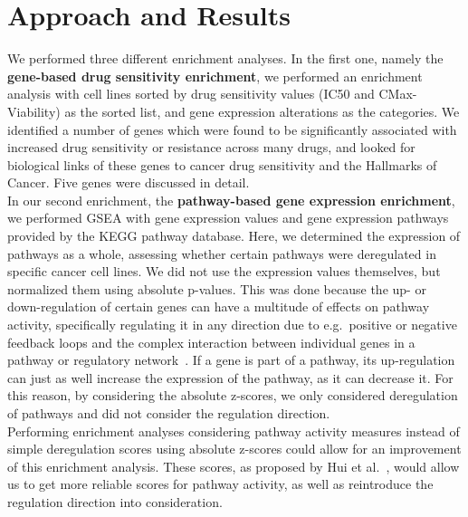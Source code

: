 \section{Approach and Results}\label{sec:approach_results}
We performed three different enrichment analyses. In the first one, namely the \textbf{gene-based drug sensitivity enrichment}, we performed an enrichment analysis with cell lines sorted by drug sensitivity values (IC50 and CMax-Viability) as the sorted list, and gene expression alterations as the categories.
We identified a number of genes which were found to be significantly associated with increased drug sensitivity or resistance across many drugs, and looked for biological links of these genes to cancer drug sensitivity and the Hallmarks of Cancer. Five genes were discussed in detail.\\
In our second enrichment, the \textbf{pathway-based gene expression enrichment}, we performed GSEA with gene expression values and gene expression pathways provided by the KEGG pathway database. Here, we determined the expression of pathways as a whole, assessing whether certain pathways were deregulated in specific cancer cell lines. We did not use the expression values themselves, but normalized them using absolute p-values. This was done because the up- or down-regulation of certain genes can have a multitude of effects on pathway activity, specifically regulating it in any direction due to e.g.\ positive or negative feedback loops and the complex interaction between individual genes in a pathway or regulatory network~\cite{systems_biology_biological_circuits}. If a gene is part of a pathway, its up-regulation can just as well increase the expression of the pathway, as it can decrease it. For this reason, by considering the absolute z-scores, we only considered deregulation of pathways and did not consider the regulation direction.\\
Performing enrichment analyses considering pathway activity measures instead of simple deregulation scores using absolute z-scores could allow for an improvement of this enrichment analysis. These scores, as proposed by Hui et al.~\cite{pathway_activity_inference}, would allow us to get more reliable scores for pathway activity, as well as reintroduce the regulation direction into consideration.\\
